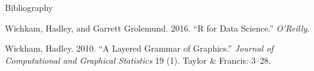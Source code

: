 \documentclass[ignorenonframetext,]{beamer}
\begin{document}
\begin{frame}{Bibliography}
\protect\hypertarget{bibliography}{}

\hypertarget{refs}{}
\leavevmode\hypertarget{ref-wickham2016r}{}%
Wichkam, Hadley, and Garrett Grolemund. 2016. ``R for Data Science.''
\emph{O'Reilly}.

\leavevmode\hypertarget{ref-wickham2010layered}{}%
Wickham, Hadley. 2010. ``A Layered Grammar of Graphics.'' \emph{Journal
of Computational and Graphical Statistics} 19 (1). Taylor \& Francis:
3--28.

\end{frame}
\end{document}
